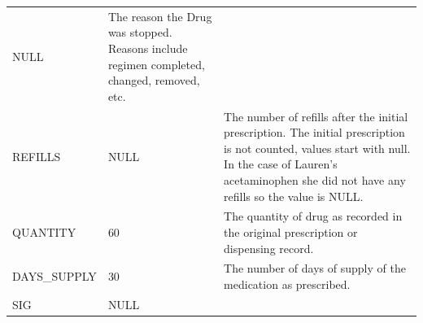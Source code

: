 \documentclass[11pt]{book}
\begin{document}
\begin{longtable}[]{@{}lll@{}}
\begin{minipage}[t]{0.14\columnwidth}
NULL\strut
\end{minipage} & \begin{minipage}[t]{0.47\columnwidth}\raggedright\strut
The reason the Drug was stopped. Reasons include regimen completed,
changed, removed, etc.\strut
\end{minipage}\tabularnewline
\begin{minipage}[t]{0.30\columnwidth}\raggedright\strut
REFILLS\strut
\end{minipage} & \begin{minipage}[t]{0.14\columnwidth}\raggedright\strut
NULL\strut
\end{minipage} & \begin{minipage}[t]{0.47\columnwidth}\raggedright\strut
The number of refills after the initial prescription. The initial
prescription is not counted, values start with null. In the case of
Lauren's acetaminophen she did not have any refills so the value is
NULL.\strut
\end{minipage}\tabularnewline
\begin{minipage}[t]{0.30\columnwidth}\raggedright\strut
QUANTITY\strut
\end{minipage} & \begin{minipage}[t]{0.14\columnwidth}\raggedright\strut
60\strut
\end{minipage} & \begin{minipage}[t]{0.47\columnwidth}\raggedright\strut
The quantity of drug as recorded in the original prescription or
dispensing record.\strut
\end{minipage}\tabularnewline
\begin{minipage}[t]{0.30\columnwidth}\raggedright\strut
DAYS\_SUPPLY\strut
\end{minipage} & \begin{minipage}[t]{0.14\columnwidth}\raggedright\strut
30\strut
\end{minipage} & \begin{minipage}[t]{0.47\columnwidth}\raggedright\strut
The number of days of supply of the medication as prescribed.\strut
\end{minipage}\tabularnewline
\begin{minipage}[t]{0.30\columnwidth}\raggedright\strut
SIG\strut
\end{minipage} & \begin{minipage}[t]{0.14\columnwidth}\raggedright\strut
NULL\strut
\end{minipage} & \begin{minipage}[t]{0.47\columnwidth}\raggedright\strut

\end{minipage}
\end{longtable}
\end{document}
